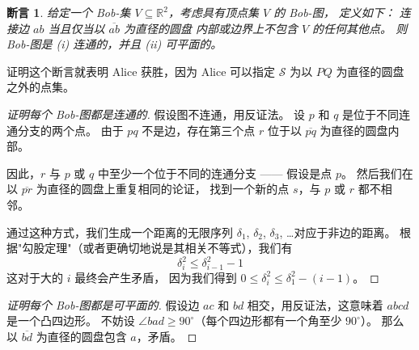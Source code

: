 \documentclass[11pt]{article}
\theoremstyle{claimstyle}
\newtheorem{claim}{断言}
\theoremstyle{remarkstyle}
\begin{document}
\begin{claim}
  给定一个 Bob-集 $V \subseteq \mathbb{R}^2$，考虑具有顶点集 $V$ 的 \emph{Bob-图}，
  定义如下：
  连接边 $ab$ 当且仅当以 $\overline{ab}$ 为直径的圆盘
  内部或边界上不包含 $V$ 的任何其他点。
  则 Bob-图是 (i) 连通的，并且 (ii) 可平面的。
\end{claim}

证明这个断言就表明 Alice 获胜，因为 Alice 可以指定 $\mathcal{S}$
为以 $PQ$ 为直径的圆盘之外的点集。

\begin{proof}[证明每个 Bob-图都是连通的]
  假设图不连通，用反证法。
  设 $p$ 和 $q$ 是位于不同连通分支的两个点。
  由于 $pq$ 不是边，存在第三个点 $r$
  位于以 $\overline{pq}$ 为直径的圆盘内部。

  因此，$r$ 与 $p$ 或 $q$ 中至少一个位于不同的连通分支
  —— 假设是点 $p$。
  然后我们在以 $\overline{pr}$ 为直径的圆盘上重复相同的论证，
  找到一个新的点 $s$，与 $p$ 或 $r$ 都不相邻。
  
  通过这种方式，我们生成一个距离的无限序列
  $\delta_1$, $\delta_2$, $\delta_3$, \dots 对应于非边的距离。
  根据"勾股定理"（或者更确切地说是其相关不等式），我们有
  \[ \delta_i^2 \le \delta_{i-1}^2 - 1 \]
  这对于大的 $i$ 最终会产生矛盾，
  因为我们得到 $0 \le \delta_i^2 \le \delta_1^2 - (i-1)$。
\end{proof}

\begin{proof}[证明每个 Bob-图都是可平面的]
  假设边 $ac$ 和 $bd$ 相交，用反证法，这意味着 $abcd$ 是一个凸四边形。
  不妨设 $\angle bad \ge 90^\circ$（每个四边形都有一个角至少 $90^\circ$）。
  那么以 $\overline{bd}$ 为直径的圆盘包含 $a$，矛盾。
\end{proof}
\end{document}
